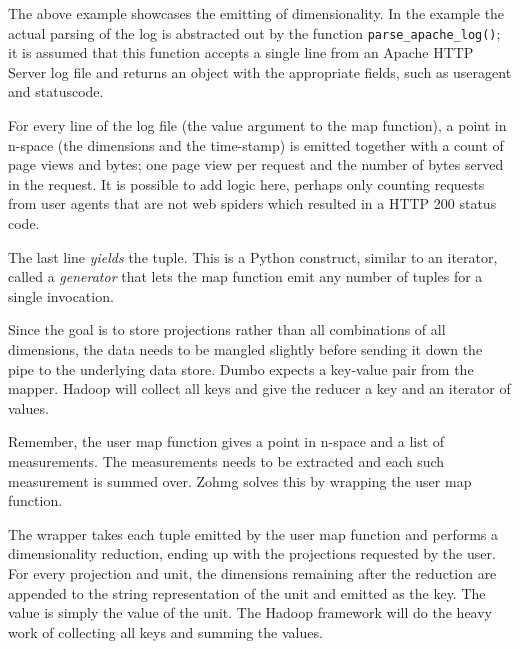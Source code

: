 \vspace{12pt}

The above example showcases the emitting of dimensionality. In the example the
actual parsing of the log is abstracted out by the function
\texttt{parse\_apache\_log()}; it is assumed that this function accepts a single
line from an Apache HTTP Server log file and returns an object with the
appropriate fields, such as useragent and statuscode.

For every line of the log file (the value argument to the map function), a point
in n-space (the dimensions and the time-stamp) is emitted together with a count
of page views and bytes; one page view per request and the number of bytes served
in the request. It is possible to add logic here, perhaps only counting requests
from user agents that are not web spiders which resulted in a HTTP 200 status
code.

The last line \textit{yields} the tuple. This is a Python construct, similar to
an iterator, called a \textit{generator} that lets the map function emit any
number of tuples for a single invocation.

Since the goal is to store projections rather than all combinations of all
dimensions, the data needs to be mangled slightly before sending it down
the pipe to the underlying data store. Dumbo expects a key-value pair from the
mapper. Hadoop will collect all keys and give the reducer a key and an iterator
of values.

%

Remember, the user map function gives a point in n-space and a list of
measurements. The measurements needs to be extracted and each such measurement
is summed over. Zohmg solves this by wrapping the user map function.

The wrapper takes each tuple emitted by the user map function and performs a
dimensionality reduction, ending up with the projections requested by the user.
For every projection and unit, the dimensions remaining after the reduction are
appended to the string representation of the unit and emitted as the key. The
value is simply the value of the unit. The Hadoop framework will do the heavy
work of collecting all keys and summing the values.

